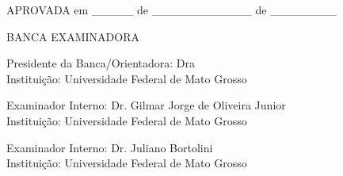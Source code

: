 \thispagestyle{empty}
\begin{center}\large
	\imprimirautor
\end{center}
\vspace*{0.2cm}


\begin{center}
	\imprimirtitulo
\end{center}
\vspace*{0.25cm}
\begin{flushright}
	\parbox[t]{9cm}{
	\SingleSpacing
	\imprimirpreambulo
	}
\end{flushright}



\vspace{0.5cm}
\begin{center}
	\noindent APROVADA em \_\_\_\_\_ de \_\_\_\_\_\_\_\_\_\_\_\_ de \_\_\_\_\_\_\_\_
\end{center}
\vspace{1.5cm}

\begin{center}
	BANCA EXAMINADORA
\end{center}
\vspace*{1cm}
\begin{center}
	\begin{minipage}[t]{10cm}
		\hrulefill
		\vspace*{-0.5cm}
		\begin{center}Presidente da Banca/Orientadora: Dra \imprimirorientador 
			\\
			Instituição: Universidade Federal de Mato Grosso\end{center}
		\vspace*{1cm}
		\hrulefill
		\vspace*{-0.5cm}
		\begin{center}Examinador Interno: Dr. Gilmar Jorge de Oliveira Junior\\
			Instituição: Universidade Federal de Mato Grosso\end{center}
		\vspace*{1cm}
		\hrulefill
		\vspace*{-0.5cm}
	\begin{center}Examinador Interno: Dr. Juliano Bortolini\\
	Instituição: Universidade Federal de Mato Grosso\end{center}
	\end{minipage}
\end{center}
\vfill

